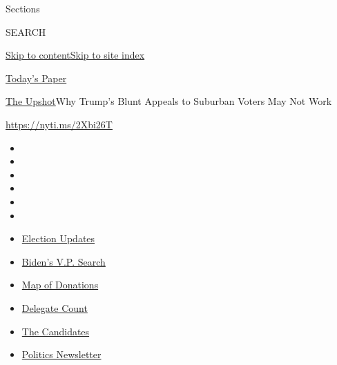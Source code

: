 Sections

SEARCH

\protect\hyperlink{site-content}{Skip to
content}\protect\hyperlink{site-index}{Skip to site index}

\href{https://myaccount.nytimes.com/auth/login?response_type=cookie\&client_id=vi}{}

\href{https://www.nytimes.com/section/todayspaper}{Today's Paper}

\href{/section/upshot}{The Upshot}\textbar{}Why Trump's Blunt Appeals to
Suburban Voters May Not Work

\url{https://nyti.ms/2Xbi26T}

\begin{itemize}
\item
\item
\item
\item
\item
\item
\end{itemize}

\begin{itemize}
\item
  \href{https://www.nytimes.com/2020/08/04/us/elections/primary-election-michigan-arizona-kansas.html?action=click\&pgtype=Article\&state=default\&region=TOP_BANNER\&context=storylines_menu}{Election
  Updates}
\item
  \href{https://www.nytimes.com/article/biden-vice-president-2020.html?action=click\&pgtype=Article\&state=default\&region=TOP_BANNER\&context=storylines_menu}{Biden's
  V.P. Search}
\item
  \href{https://www.nytimes.com/interactive/2020/07/24/us/politics/trump-biden-campaign-donors.html?action=click\&pgtype=Article\&state=default\&region=TOP_BANNER\&context=storylines_menu}{Map
  of Donations}
\item
  \href{https://www.nytimes.com/interactive/2020/us/elections/delegate-count-primary-results.html?action=click\&pgtype=Article\&state=default\&region=TOP_BANNER\&context=storylines_menu}{Delegate
  Count}
\item
  \href{https://www.nytimes.com/interactive/2019/us/politics/2020-presidential-candidates.html?action=click\&pgtype=Article\&state=default\&region=TOP_BANNER\&context=storylines_menu}{The
  Candidates}
\item
  \href{https://www.nytimes.com/newsletters/politics?action=click\&pgtype=Article\&state=default\&region=TOP_BANNER\&context=storylines_menu}{Politics
  Newsletter}
\end{itemize}

